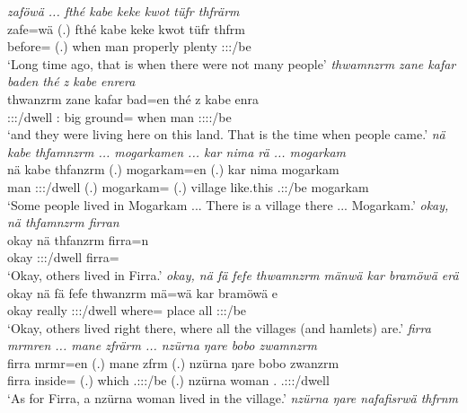 \clearpage
\begin{exe}
	\emph{zaföwä ... fthé kabe keke kwot tüfr thfrärm}\\
	\gll zafe=wä (.) fthé kabe keke kwot tüfr thfrm\\
	before={\Emph} (.) when man {\Neg} properly plenty \Stpl:\Sbj:\Pst:\Dur/be\\
	\trans `Long time ago, that is when there were not many people'
	\emph{thwamnzrm zane kafar baden thé z kabe enrera}\\
	\gll thwanzrm zane kafar bad=en thé z kabe enra\\
	\Stpl:\Sbj:\Pst:\Dur/dwell \Dem:{\Prox} big ground={\Loc} when {\Iam} man \Stpl:\Sbj:\Pst:\Ipfv:\Venit/be\\
	\trans `and they were living here on this land. That is the time when people came.'
	\emph{nä kabe thfamnzrm ... mogarkamen ... kar nima rä ... mogarkam}\\
	\gll nä kabe thfanzrm (.) mogarkam=en (.) kar nima  mogarkam\\
	{\Indf} man \Stpl:\Sbj:\Pst:\Dur/dwell (.) mogarkam={\Loc} (.) village {like.this} \Tsg.\F:\Nonpast:\Ipfv/be mogarkam\\
	\trans `Some people lived in Mogarkam ... There is a village there ... Mogarkam.'
	\emph{okay, nä thfamnzrm firran}\\
	\gll okay nä thfanzrm firra=n\\
	okay {\Indf} \Stpl:\Sbj:\Pst:\Dur/dwell firra={\Loc}\\
	\trans `Okay, others lived in Firra.'
	\emph{okay, nä fä fefe thwamnzrm mänwä kar bramöwä erä}\\
	\gll okay nä fä fefe thwanzrm mä=wä kar bramöwä e\\
	okay {\Indf} {\Dist} really \Stpl:\Sbj:\Pst:\Dur/dwell where={\Emph} place all \Stpl:\Sbj:\Nonpast:\Ipfv/be\\
	\trans `Okay, others lived right there, where all the villages (and hamlets) are.'
	\emph{firra mrmren ... mane zfrärm ... nzürna ŋare bobo zwamnzrm}\\
	\gll firra mrmr=en (.) mane zfrm (.) nzürna ŋare bobo zwanzrm\\
	firra inside={\Loc} (.) which \Tsg.\F:\Sbj:\Pst:\Dur/be (.) nzürna woman \Med.{\All} \Tsg.\F:\Sbj:\Pst:\Dur/dwell\\
	\trans `As for Firra, a nzürna woman lived in the village.'
	\emph{nzürna ŋare nafafisrwä thfrnm}\\

\end{exe}
